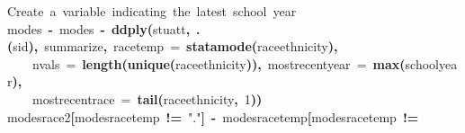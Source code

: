 \documentclass[12pt]{article}
\makeatletter
\newcommand{\hlnumber}[1]{\textcolor[rgb]{0,0,0}{#1}}%
\newcommand{\hlfunctioncall}[1]{\textcolor[rgb]{0.501960784313725,0,0.329411764705882}{\textbf{#1}}}%
\newcommand{\hlstring}[1]{\textcolor[rgb]{0.6,0.6,1}{#1}}%
\newcommand{\hlkeyword}[1]{\textcolor[rgb]{0,0,0}{\textbf{#1}}}%
\newcommand{\hlargument}[1]{\textcolor[rgb]{0.690196078431373,0.250980392156863,0.0196078431372549}{#1}}%
\newcommand{\hlcomment}[1]{\textcolor[rgb]{0.180392156862745,0.6,0.341176470588235}{#1}}%
\newcommand{\hlassignement}[1]{\textcolor[rgb]{0,0,0}{\textbf{#1}}}%
\newcommand{\hlsymbol}[1]{\textcolor[rgb]{0,0,0}{#1}}%
\newcommand{\hlstd}[1]{\textcolor[rgb]{0,0,0}{#1}}%
\newenvironment{kframe}{%
 \def\FrameCommand##1{\hskip\@totalleftmargin \hskip-\fboxsep
 \colorbox{shadecolor}{##1}\hskip-\fboxsep
     \hskip-\linewidth \hskip-\@totalleftmargin \hskip\columnwidth}%
 \MakeFramed {\advance\hsize-\width
   \@totalleftmargin\z@ \linewidth\hsize
   \@setminipage}}%
 {\par\unskip\endMakeFramed}
\newenvironment{knitrout}{}{} %
\makeatother
\begin{document}
\begin{knitrout}
\color{fgcolor}\begin{kframe}
\begin{flushleft}
\ttfamily\noindent
\hlcomment{\usebox{\hlnormalsizeboxhash}{\ }Create{\ }a{\ }variable{\ }indicating{\ }the{\ }latest{\ }school{\ }year}\hspace*{\fill}\\
\hlstd{}\hlsymbol{modes}{\ }\hlassignement{\usebox{\hlnormalsizeboxlessthan}-}{\ }\hlsymbol{modes}{\ }\hlassignement{\usebox{\hlnormalsizeboxlessthan}-}{\ }\hlfunctioncall{ddply}\hlkeyword{(}\hlsymbol{stuatt}\hlkeyword{,}{\ }\hlfunctioncall{.}\hlkeyword{(}\hlsymbol{sid}\hlkeyword{)}\hlkeyword{,}{\ }\hlsymbol{summarize}\hlkeyword{,}{\ }\hlargument{race\usebox{\hlnormalsizeboxunderscore}temp}{\ }\hlargument{=}{\ }\hlfunctioncall{statamode}\hlkeyword{(}\hlsymbol{race\usebox{\hlnormalsizeboxunderscore}ethnicity}\hlkeyword{)}\hlkeyword{,}\hspace*{\fill}\\
\hlstd{}{\ }{\ }{\ }{\ }\hlargument{nvals}{\ }\hlargument{=}{\ }\hlfunctioncall{length}\hlkeyword{(}\hlfunctioncall{unique}\hlkeyword{(}\hlsymbol{race\usebox{\hlnormalsizeboxunderscore}ethnicity}\hlkeyword{)}\hlkeyword{)}\hlkeyword{,}{\ }\hlargument{most\usebox{\hlnormalsizeboxunderscore}recent\usebox{\hlnormalsizeboxunderscore}year}{\ }\hlargument{=}{\ }\hlfunctioncall{max}\hlkeyword{(}\hlsymbol{school\usebox{\hlnormalsizeboxunderscore}year}\hlkeyword{)}\hlkeyword{,}\hspace*{\fill}\\
\hlstd{}{\ }{\ }{\ }{\ }\hlargument{most\usebox{\hlnormalsizeboxunderscore}recent\usebox{\hlnormalsizeboxunderscore}race}{\ }\hlargument{=}{\ }\hlfunctioncall{tail}\hlkeyword{(}\hlsymbol{race\usebox{\hlnormalsizeboxunderscore}ethnicity}\hlkeyword{,}{\ }\hlnumber{1}\hlkeyword{)}\hlkeyword{)}\hspace*{\fill}\\
\hlstd{}\hlsymbol{modes}\hlkeyword{\usebox{\hlnormalsizeboxdollar}}\hlsymbol{race2}\hlkeyword{[}\hlsymbol{modes}\hlkeyword{\usebox{\hlnormalsizeboxdollar}}\hlsymbol{race\usebox{\hlnormalsizeboxunderscore}temp}{\ }\hlkeyword{!=}{\ }\hlstring{"{}."{}}\hlkeyword{]}{\ }\hlassignement{\usebox{\hlnormalsizeboxlessthan}-}{\ }\hlsymbol{modes}\hlkeyword{\usebox{\hlnormalsizeboxdollar}}\hlsymbol{race\usebox{\hlnormalsizeboxunderscore}temp}\hlkeyword{[}\hlsymbol{modes}\hlkeyword{\usebox{\hlnormalsizeboxdollar}}\hlsymbol{race\usebox{\hlnormalsizeboxunderscore}temp}{\ }\hlkeyword{!=}\hspace*{\fill}\\

\end{flushleft}
\end{kframe}
\end{knitrout}
\end{document}
